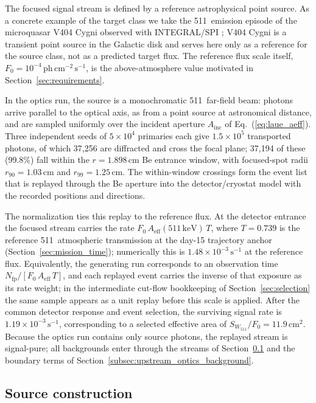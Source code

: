 \documentclass[pdflatex,sn-mathphys-num]{sn-jnl}
\newcommand{\keV}{\,\mathrm{keV}}
\newcommand{\phcms}{\,\mathrm{ph\,cm^{-2}\,s^{-1}}}
\newcommand{\cps}{\,\mathrm{s^{-1}}}
\newcommand{\wii}{W_{511}}
\newcommand{\aeff}{A_{\mathrm{eff}}}
\newcommand{\fzero}{F_{0}}
\begin{document}
The focused signal stream is defined by a reference astrophysical point
source. As a concrete example of the target class we take the 511\keV{}
emission episode of the microquasar V404 Cygni observed with INTEGRAL/SPI
\cite{Siegert2016V404}; V404 Cygni is a transient point source in the Galactic
disk and serves here only as a reference for the source class, not as a
predicted target flux. The reference flux scale itself,
$\fzero=10^{-4}\phcms$, is the above-atmosphere value motivated in
Section~\ref{sec:requirements}.

In the optics run, the source is a monochromatic 511\keV{} far-field beam:
photons arrive parallel to the optical axis, as from a point source at
astronomical distance, and are sampled uniformly over the incident aperture
$A_{\mathrm{inc}}$ of Eq.~(\ref{eq:laue_aeff}). Three independent seeds of
$5\times10^{4}$ primaries each give $1.5\times10^{5}$ transported photons, of
which 37,256 are diffracted and cross the focal plane; 37,194 of these
(99.8\%) fall within the $r=1.898\,\mathrm{cm}$ Be entrance window, with
focused-spot radii $r_{90}=1.03\,\mathrm{cm}$ and $r_{99}=1.25\,\mathrm{cm}$.
The within-window crossings form the event list that is replayed through the
Be aperture into the detector/cryostat model with the recorded positions and
directions.

The normalization ties this replay to the reference flux. At the detector
entrance the focused stream carries the rate
$\fzero\,\aeff(511\keV)\,T$, where $T=0.739$ is the reference 511\keV{}
atmospheric transmission at the day-15 trajectory anchor
(Section~\ref{sec:mission_time}); numerically this is
$1.48\times10^{-3}\cps$ at the reference flux. Equivalently, the generating
run corresponds to an observation time $N_{\mathrm{fp}}/[\fzero\,\aeff\,T]$,
and each replayed event carries the inverse of that exposure as its rate
weight; in the intermediate cut-flow bookkeeping of
Section~\ref{sec:selection} the same sample appears as a unit replay before
this scale is applied. After the common detector response and event selection,
the surviving signal rate is $1.19\times10^{-3}\cps$, corresponding to a
selected effective area of $S_{\wii}/\fzero=11.9\,\mathrm{cm^2}$. Because the
optics run contains only source photons, the replayed stream is signal-pure;
all backgrounds enter through the streams of Section~\ref{sec:background} and
the boundary terms of Section~\ref{subsec:upstream_optics_background}.

\subsection{Source construction}
\label{sec:background}
\end{document}
